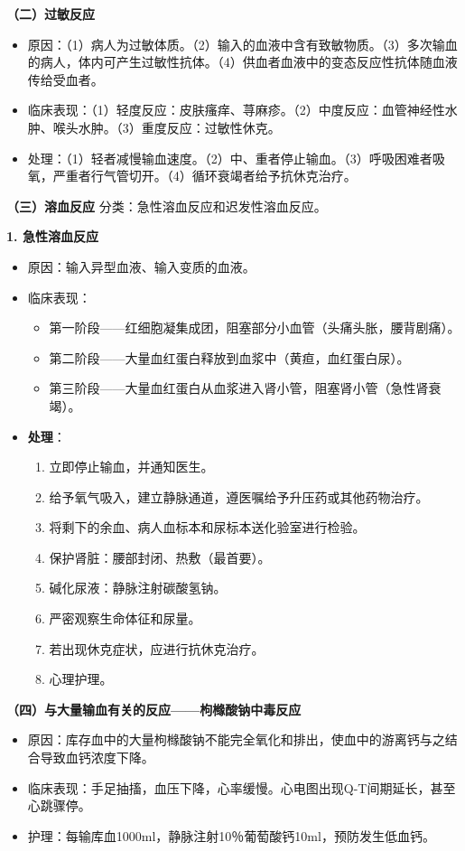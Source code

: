 \documentclass[11pt, a4paper]{ctexart}
\begin{document}
\textbf{（二）过敏反应}
\begin{itemize}
	\item 原因：（1）病人为过敏体质。（2）输入的血液中含有致敏物质。（3）多次输血的病人，体内可产生过敏性抗体。（4）供血者血液中的变态反应性抗体随血液传给受血者。
	\item 临床表现：（1）轻度反应：皮肤瘙痒、荨麻疹。（2）中度反应：血管神经性水肿、喉头水肿。（3）重度反应：过敏性休克。
	\item 处理：（1）轻者减慢输血速度。（2）中、重者停止输血。（3）呼吸困难者吸氧，严重者行气管切开。（4）循环衰竭者给予抗休克治疗。
\end{itemize}

\textbf{（三）溶血反应}
分类：急性溶血反应和迟发性溶血反应。

\textbf{1. 急性溶血反应}
\begin{itemize}
	\item 原因：输入异型血液、输入变质的血液。
	\item 临床表现：
	      \begin{itemize}
		      \item 第一阶段——红细胞凝集成团，阻塞部分小血管（头痛头胀，腰背剧痛）。
		      \item 第二阶段——大量血红蛋白释放到血浆中（黄疸，血红蛋白尿）。
		      \item 第三阶段——大量血红蛋白从血浆进入肾小管，阻塞肾小管（急性肾衰竭）。
	      \end{itemize}
	\item \textbf{处理}：
	      \begin{enumerate}
		      \item 立即停止输血，并通知医生。
		      \item 给予氧气吸入，建立静脉通道，遵医嘱给予升压药或其他药物治疗。
		      \item 将剩下的余血、病人血标本和尿标本送化验室进行检验。
		      \item 保护肾脏：腰部封闭、热敷（最首要）。
		      \item 碱化尿液：静脉注射碳酸氢钠。
		      \item 严密观察生命体征和尿量。
		      \item 若出现休克症状，应进行抗休克治疗。
		      \item 心理护理。
	      \end{enumerate}
\end{itemize}

\textbf{（四）与大量输血有关的反应——枸橼酸钠中毒反应}
\begin{itemize}
	\item 原因：库存血中的大量枸橼酸钠不能完全氧化和排出，使血中的游离钙与之结合导致血钙浓度下降。
	\item 临床表现：手足抽搐，血压下降，心率缓慢。心电图出现Q-T间期延长，甚至心跳骤停。
	\item 护理：每输库血1000ml，静脉注射10％葡萄酸钙10ml，预防发生低血钙。
\end{itemize}
\end{document}
